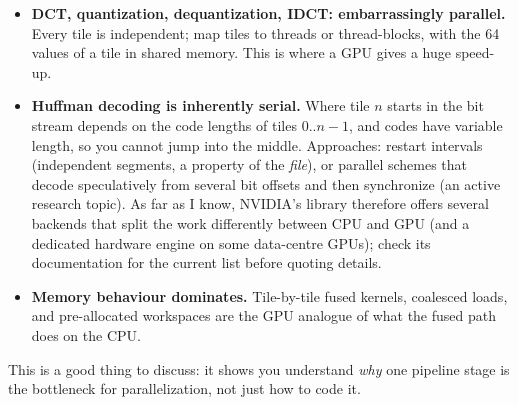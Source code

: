 \begin{itemize}
\item \textbf{DCT, quantization, dequantization, IDCT: embarrassingly parallel.} Every tile is independent; map tiles to threads or thread-blocks, with the 64 values of a tile in shared memory. This is where a GPU gives a huge speed-up.
\item \textbf{Huffman decoding is inherently serial.} Where tile $n$ starts in the bit stream depends on the code lengths of tiles $0..n-1$, and codes have variable length, so you cannot jump into the middle. Approaches: restart intervals (independent segments, a property of the \emph{file}), or parallel schemes that decode speculatively from several bit offsets and then synchronize (an active research topic). As far as I know, NVIDIA's  library therefore offers several backends that split the work differently between CPU and GPU (and a dedicated hardware engine on some data-centre GPUs); check its documentation for the current list before quoting details.
\item \textbf{Memory behaviour dominates.} Tile-by-tile fused kernels, coalesced loads, and pre-allocated workspaces are the GPU analogue of what the fused path does on the CPU.
\end{itemize}

This is a good thing to discuss: it shows you understand \emph{why} one pipeline stage is the bottleneck for parallelization, not just how to code it.
